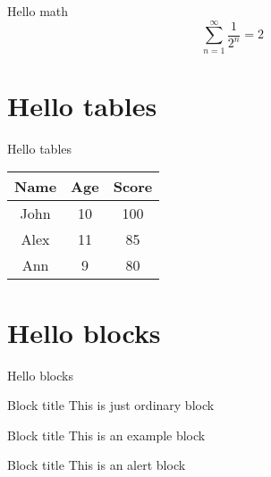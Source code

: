 \documentclass[xetex]{beamer}
\begin{document}
    \begin{frame}{Hello math}
        $$ \sum_{n=1}^\infty \frac{1}{2^n} = 2 $$
    \end{frame}

    \section{Hello tables}

    \begin{frame}{Hello tables}
        \centering
        \begin{tabular}{|c|c|c|}
            \hline
            Name & Age & Score \\
            \hline
            John & 10 & 100 \\
            Alex & 11 & 85 \\
            Ann  & 9  & 80 \\
            \hline
        \end{tabular}
    \end{frame}

    \section{Hello blocks}

    \begin{frame}{Hello blocks}
        \begin{block}{Block title}
            This is just ordinary block
        \end{block}

        \begin{exampleblock}{Block title}
            This is an example block
        \end{exampleblock}

        \begin{alertblock}{Block title}
            This is an alert block
        \end{alertblock}
    \end{frame}
\end{document}
